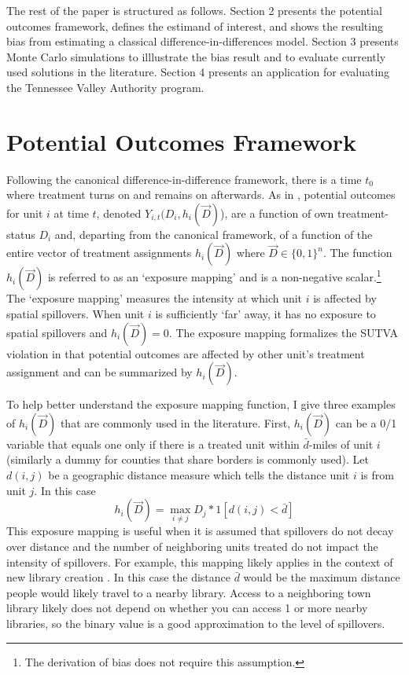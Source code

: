 \documentclass[11pt]{article}
\begin{document}
The rest of the paper is structured as follows. Section 2 presents the potential outcomes framework, defines the estimand of interest, and shows the resulting bias from estimating a classical difference-in-differences model. Section 3 presents Monte Carlo simulations to illlustrate the bias result and to evaluate currently used solutions in the literature. Section 4 presents an application for evaluating the Tennessee Valley Authority program. 



\section{Potential Outcomes Framework}

Following the canonical difference-in-difference framework, there is a time $t_0$ where treatment turns on and remains on afterwards. As in \citet{Vazquez-Bare_2019}, potential outcomes for unit $i$ at time $t$, denoted $Y_{i,t}(D_i, h_i(\vec{D})$), are a function of own treatment-status $D_i$ and,  departing from the canonical framework, of a function of the entire vector of treatment assignments $h_i(\vec{D})$ where $\vec{D} \in \{0,1 \}^n$. The function $h_i(\vec{D})$ is referred to as an `exposure mapping' and is a non-negative scalar.\footnote{The derivation of bias does not require this assumption.} The `exposure mapping' measures the intensity at which unit $i$ is affected by spatial spillovers. When unit $i$ is sufficiently `far' away, it has no exposure to spatial spillovers and $h_i(\vec{D}) = 0$. The exposure mapping formalizes the SUTVA violation in that potential outcomes are affected by other unit's treatment assignment and can be summarized by $h_i(\vec{D})$. 

To help better understand the exposure mapping function, I give three examples of $h_i(\vec{D})$ that are commonly used in the literature. First, $h_i(\vec{D})$ can be a 0/1 variable that equals one only if there is a treated unit within $\bar{d}$-miles of unit $i$ (similarly a dummy for counties that share borders is commonly used). Let $d(i,j)$ be a geographic distance measure which tells the distance unit $i$ is from unit $j$.  In this case \[
    h_i(\vec{D}) = \max_{i \neq j} D_j * 1[ d(i,j) < \bar{d} ] 
\] 
This exposure mapping is useful when it is assumed that spillovers do not decay over distance and the number of neighboring units treated do not impact the intensity of spillovers. For example, this mapping likely applies in the context of new library creation \citep{Berkes_Nencka_2020}. In this case the distance $\bar{d}$ would be the maximum distance people would likely travel to a nearby library. Access to a neighboring town library likely does not depend on whether you can access 1 or more nearby libraries, so the binary value is a good approximation to the level of spillovers.  
\end{document}
